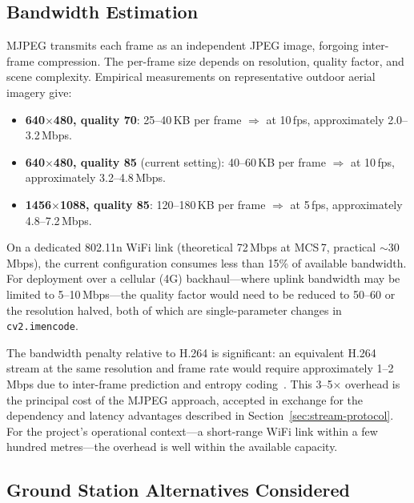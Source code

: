 \subsection{Bandwidth Estimation}\label{sec:bandwidth}

MJPEG transmits each frame as an independent JPEG image, forgoing inter-frame compression.
The per-frame size depends on resolution, quality factor, and scene complexity. Empirical
measurements on representative outdoor aerial imagery give:

\begin{itemize}
  \item \textbf{640$\times$480, quality 70}: 25--40\,KB per frame $\Rightarrow$ at 10\,fps,
        approximately 2.0--3.2\,Mbps.
  \item \textbf{640$\times$480, quality 85} (current setting): 40--60\,KB per frame
        $\Rightarrow$ at 10\,fps, approximately 3.2--4.8\,Mbps.
  \item \textbf{1456$\times$1088, quality 85}: 120--180\,KB per frame $\Rightarrow$ at
        5\,fps, approximately 4.8--7.2\,Mbps.
\end{itemize}

On a dedicated 802.11n WiFi link (theoretical 72\,Mbps at MCS\,7, practical
${\sim}$30\,Mbps), the current configuration consumes less than 15\% of available
bandwidth. For deployment over a cellular (4G) backhaul---where uplink bandwidth may be
limited to 5--10\,Mbps---the quality factor would need to be reduced to 50--60 or the
resolution halved, both of which are single-parameter changes in \texttt{cv2.imencode}.

The bandwidth penalty relative to H.264 is significant: an equivalent H.264 stream at the
same resolution and frame rate would require approximately 1--2\,Mbps due to inter-frame
prediction and entropy coding~\cite{wiegand2003h264}. This 3--5$\times$ overhead is
the principal cost of the MJPEG approach, accepted in exchange for the dependency and
latency advantages described in Section~\ref{sec:stream-protocol}. For the project's
operational context---a short-range WiFi link within a few hundred metres---the overhead is
well within the available capacity.

\subsection{Ground Station Alternatives Considered}\label{sec:gs-alternatives}

